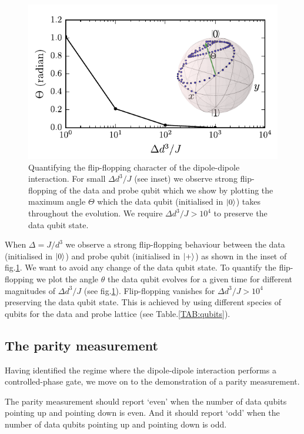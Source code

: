 \begin{figure}[H]
	\includegraphics[width=\linewidth]{../Figures/flip-flop}
	\caption{Quantifying the flip-flopping character of the dipole-dipole interaction. For small $\Delta d^3/ J$ (see inset) we observe strong flip-flopping of the data and probe qubit which we show by plotting the maximum angle $\Theta$ which the data qubit (initialised in $\ket{0}$) takes throughout the evolution. We require $\Delta d^3/ J > 10^4$ to preserve the data qubit state.}
	\label{FIG:flip-flop}
\end{figure}

When $\Delta = J/d^3$ we observe a strong flip-flopping behaviour between the data (initialised in $\ket{0}$) and probe qubit (initialised in $\ket{+}$) as shown in the inset of fig.\@ \ref{FIG:flip-flop}. We want to avoid any change of the data qubit state. To quantify the flip-flopping we plot the angle $\theta$ the data qubit evolves for a given time for different magnitudes of $\Delta d^3/ J$ (see fig.\@ \ref{FIG:flip-flop}). Flip-flopping vanishes for $\Delta d^3/ J > 10^4$ preserving the data qubit state. This is achieved by using different species of qubits for the data and probe lattice (see Table.\@ \ref{TAB:qubits}).

\subsection{The parity measurement}
Having identified the regime where the dipole-dipole interaction performs a controlled-phase gate, we move on to the demonstration of a parity measurement.

The parity measurement should report `even' when the number of data qubits pointing up and pointing down is even. And it should report `odd' when the number of data qubits pointing up and pointing down is odd.

